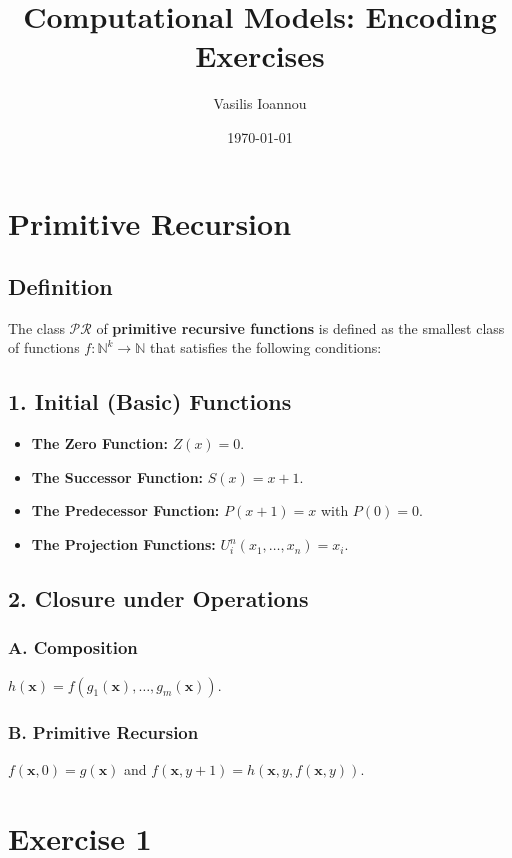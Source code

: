 \documentclass{article}
\title{Computational Models: Encoding Exercises}
\author{Vasilis Ioannou}
\date{\today}
\begin{document}
\maketitle

\section*{Primitive Recursion}

\subsection*{Definition}

The class $\mathcal{PR}$ of \textbf{primitive recursive functions} is defined as the smallest class of functions $f: \mathbb{N}^k \to \mathbb{N}$ that satisfies the following conditions:

\subsection*{1. Initial (Basic) Functions}
\begin{itemize}
    \item \textbf{The Zero Function:} $Z(x) = 0$.
    \item \textbf{The Successor Function:} $S(x) = x + 1$.
    \item \textbf{The Predecessor Function:} $P(x + 1) = x$ with $P(0)=0$.
    \item \textbf{The Projection Functions:} $U_i^n(x_1, \dots, x_n) = x_i$.
\end{itemize}

\subsection*{2. Closure under Operations}
\subsubsection*{A. Composition}
$h(\mathbf{x}) = f(g_1(\mathbf{x}), \dots, g_m(\mathbf{x}))$.
\subsubsection*{B. Primitive Recursion}
$f(\mathbf{x}, 0) = g(\mathbf{x})$ and $f(\mathbf{x}, y+1) = h(\mathbf{x}, y, f(\mathbf{x}, y))$.

\pagebreak
\section*{Exercise 1}
\end{document}
